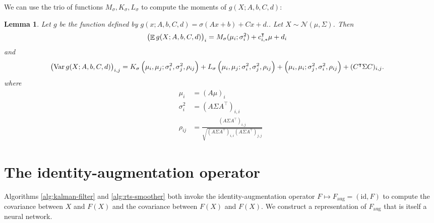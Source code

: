 \documentclass[oneside, article]{memoir}
\newtheorem{lemma}{Lemma}
\DeclareMathOperator{\expect}{\mathbb{E}}
\DeclareMathOperator{\Var}{\operatorname{Var}}
\begin{document}
We can use the trio of functions \(M_\sigma, K_\sigma, L_\sigma\) to
compute the moments of \(g(X; A, b, C, d)\):
\begin{lemma}
  Let \(g\) be the function defined by \(g(x; A, b, C, d) = \sigma(A
  x+ b) + C x + d.\).
  Let \(X \sim \mathcal N(\mu, \Sigma)\).
  Then
  \begin{align*}
    \del{\expect g(X; A, b, C, d)}_i &= M_\sigma(\mu_i; \sigma_i^2) +
    c_{i, *}^\intercal \mu + d_i
  \end{align*}
  and
  \begin{align*}
    \del{\Var g(X; A, b, C, d)}_{i, j}
    &= K_\sigma\del{
      \mu_i, \mu_j; \sigma_i^2, \sigma_j^2, \rho_{ij}
    }
    + L_\sigma\del{
      \mu_i, \mu_j; \sigma_i^2, \sigma_j^2, \rho_{ij}
    }
    + \del{
      \mu_i, \mu_i; \sigma_j^2, \sigma_i^2, \rho_{ij}
    }
    + (C^\intercal \Sigma C)_{i, j}.
  \end{align*}
  where
  \begin{align*}
    \mu_i &= (A\mu)_i
    \\
    \sigma_i^2 &= (A\Sigma A^\intercal)_{i,i}
    \\
    \rho_{ij} &= \frac{(A\Sigma A^\intercal)_{i,j}}{\sqrt{(A\Sigma
    A^\intercal)_{i,i} (A\Sigma A^\intercal)_{j,j}}}
  \end{align*}
\end{lemma}

\section{The identity-augmentation operator}
Algorithms \ref{alg:kalman-filter} and \ref{alg:rts-smoother}
both invoke the identity-augmentation operator \(F \mapsto F_\text{aug}=(\text{id}, F)\) to compute the covariance between \(X\) and \(F(X)\) and the covariance between \(F(X)\) and \(F(X)\).
We construct a representation of \(F_\text{aug}\) that is itself a neural network.
\end{document}
